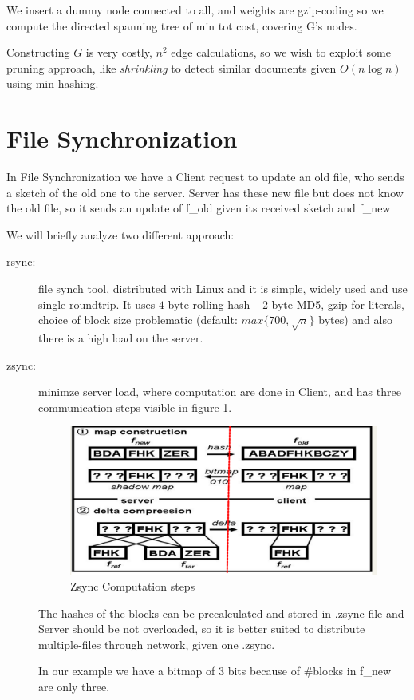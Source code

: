 We insert a dummy node connected to all, and weights are gzip-coding so we 
compute the directed spanning tree of min tot cost, covering G’s nodes.

Constructing $G$ is very costly, $n^2$ edge calculations, so we wish to exploit 
some pruning approach, like \emph{shrinkling} to detect similar documents given 
$O(n \log n)$ using min-hashing.

\section{File Synchronization}
In File Synchronization we have a Client request to update an old file, who sends a sketch of
the old one to the server.\newline
Server has these new file but does not know the old file, so it sends an update of f\_old
given its received sketch and f\_new

We will briefly analyze two different approach:
\begin{description}
	\item [rsync: ] file synch tool, distributed with Linux and it is simple, widely used and
	                use single roundtrip.\newline
			It uses $4$-byte rolling hash $+ 2$-byte MD5, gzip for literals,
			choice of block size problematic (default: $max\{700, \sqrt{n}\}$ bytes)
			and also there is a high load on the server.

	\item [zsync: ] minimze server load, where computation are done in Client, and has 
			three communication steps visible in figure \ref{img:zsync}.

			\begin{figure}
				\caption{Zsync Computation steps}
				\label{img:zsync}
				\includegraphics[width=\textwidth]{Images/zsync}
			\end{figure}
			The hashes of the blocks can be precalculated and stored in .zsync file
			and Server should be not overloaded, so it is better suited to 
			distribute multiple-files through network, given one .zsync.

			In our example we have a bitmap of $3$ bits because of \#blocks in
			f\_new are only three.
\end{description}
